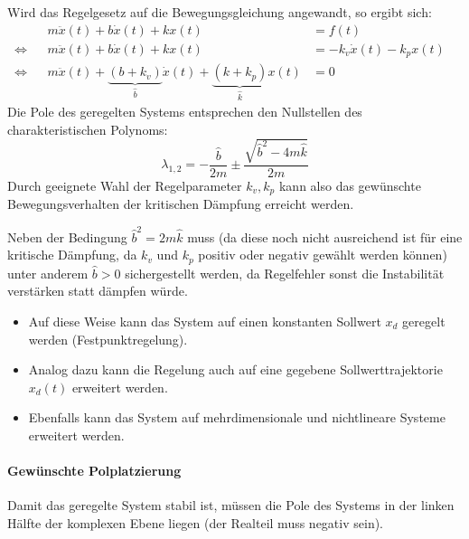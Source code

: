 				Wird das Regelgesetz auf die Bewegungsgleichung angewandt, so ergibt sich:
				\begin{align*}
					     &  & m\ddot{x}(t) + b\dot{x}(t) + kx(t)                                                                 & = f(t)                       &  \\
					\iff &  & m\ddot{x}(t) + b\dot{x}(t) + kx(t)                                                                 & = -k_v \dot{x}(t) - k_p x(t) &  \\
					\iff &  & m\ddot{x}(t) + \underbrace{(b + k_v)}_{\hat{b}} \dot{x}(t) + \underbrace{(k + k_p)}_{\hat{k}} x(t) & = 0                          &
				\end{align*}
				Die Pole des geregelten Systems entsprechen den Nullstellen des charakteristischen Polynoms:
				\begin{equation*}
					\lambda_{1, 2} = -\frac{\hat{b}}{2m} \pm \frac{\sqrt{\hat{b}^2 - 4m\hat{k}}}{2m}
				\end{equation*}
				Durch geeignete Wahl der Regelparameter \( k_v, k_p \) kann also das gewünschte Bewegungsverhalten der kritischen Dämpfung erreicht werden.
				
				Neben der Bedingung \( \hat{b}^2 = 2m\hat{k} \) muss (da diese noch nicht ausreichend ist für eine kritische Dämpfung, da \( k_v \) und \( k_p \) positiv oder negativ gewählt werden können) unter anderem \( \hat{b} > 0 \) sichergestellt werden, da Regelfehler sonst die Instabilität verstärken statt dämpfen würde.
				
				\begin{itemize}
					\item Auf diese Weise kann das System auf einen konstanten Sollwert \( x_d \) geregelt werden (Festpunktregelung).
					\item Analog dazu kann die Regelung auch auf eine gegebene Sollwerttrajektorie \( x_d(t) \) erweitert werden.
					\item Ebenfalls kann das System auf mehrdimensionale und nichtlineare Systeme erweitert werden.
				\end{itemize}
			
				\paragraph{Gewünschte Polplatzierung}
					Damit das geregelte System stabil ist, müssen die Pole des Systems in der linken Hälfte der komplexen Ebene liegen (\dh der Realteil muss negativ sein).

